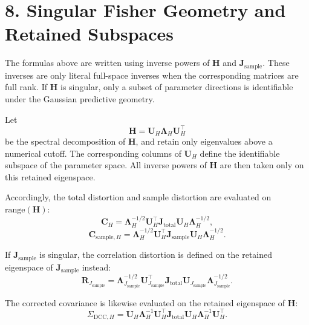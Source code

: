 \documentclass[11pt]{article}
\begin{document}
\section*{8. Singular Fisher Geometry and Retained Subspaces}

The formulas above are written using inverse powers of $\mathbf H$ and $\mathbf J_{\mathrm{sample}}$.
These inverses are only literal full-space inverses when the corresponding matrices are full rank.
If $\mathbf H$ is singular, only a subset of parameter directions is identifiable under the Gaussian predictive geometry.

Let
\begin{equation}
\mathbf H = \mathbf U_H \mathbf \Lambda_H \mathbf U_H^\top
\end{equation}
be the spectral decomposition of $\mathbf H$, and retain only eigenvalues above a numerical cutoff.
The corresponding columns of $\mathbf U_H$ define the identifiable subspace of the parameter space.
All inverse powers of $\mathbf H$ are then taken only on this retained eigenspace.

Accordingly, the total distortion and sample distortion are evaluated on $\mathrm{range}(\mathbf H)$:
\begin{equation}
\mathbf C_H
=
\mathbf \Lambda_H^{-1/2}
\mathbf U_H^\top \mathbf J_{\mathrm{total}} \mathbf U_H
\mathbf \Lambda_H^{-1/2},
\end{equation}
\begin{equation}
\mathbf C_{\mathrm{sample},H}
=
\mathbf \Lambda_H^{-1/2}
\mathbf U_H^\top \mathbf J_{\mathrm{sample}} \mathbf U_H
\mathbf \Lambda_H^{-1/2}.
\end{equation}

If $\mathbf J_{\mathrm{sample}}$ is singular, the correlation distortion is defined on the retained eigenspace of $\mathbf J_{\mathrm{sample}}$ instead:
\begin{equation}
\mathbf R_{J_{\mathrm{sample}}}
=
\mathbf \Lambda_{J_{\mathrm{sample}}}^{-1/2}
\mathbf U_{J_{\mathrm{sample}}}^\top \mathbf J_{\mathrm{total}} \mathbf U_{J_{\mathrm{sample}}}
\mathbf \Lambda_{J_{\mathrm{sample}}}^{-1/2}.
\end{equation}

The corrected covariance is likewise evaluated on the retained eigenspace of $\mathbf H$:
\begin{equation}
\Sigma_{\mathrm{DCC},H}
=
\mathbf U_H
\mathbf \Lambda_H^{-1}
\mathbf U_H^\top
\mathbf J_{\mathrm{total}}
\mathbf U_H
\mathbf \Lambda_H^{-1}
\mathbf U_H^\top.
\end{equation}
\end{document}
